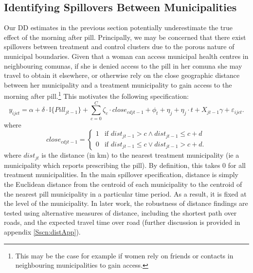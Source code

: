 \subsection{Identifying Spillovers Between Municipalities}
\label{TEENsscn:spilloverID}
Our DD estimates in the previous section potentially underestimate the 
true effect of the morning after pill.  Principally, we may be concerned that
there exist spillovers between treatment and control clusters due to the porous
nature of municipal boundaries. Given that a woman can access municipal health
centres in neighbouring comunas, if she is denied access to the pill in her
comuna she may travel to obtain it elsewhere, or otherwise rely on the close
geographic distance between her municipality and a treatment municipality to 
gain access to the morning after pill.\footnote{This may be the case for example
if women rely on friends or contacts in neighbouring municipalities to gain 
access.}  This motivates the following specification:
\begin{equation}
 \label{TEENeqn:spillover}
y_{ijct} = \alpha + \delta\cdot \mathbb{I}\{Pill_{jt-1}\} + 
\sum_{c=0}^C\zeta_c\cdot close_{cdjt-1} + \phi_t + \eta_j + \eta_j\cdot t +
X_{jt-1}\gamma + \varepsilon_{ijct}.
\end{equation}
where
\[
 close_{cdjt-1} =
  \begin{cases}
   1 & \text{if } dist_{jt-1} > c \wedge dist_{jt-1}\leq c+d   \\
   0 & \text{if } dist_{jt-1} \leq c \vee  dist_{jt-1}>c+d.
  \end{cases}
\]
where $dist_{jt}$ is the distance (in km) to the nearest treatment municipality 
(ie a municipality which reports prescribing the pill).  By definition, this takes
0 for all treatment municipalities.  In the main spillover specification, distance
is simply the Euclidean distance from the centroid of each municipality to the 
centroid of the nearest pill municipality in a particular time period.  As a result, 
it is fixed at the level of the municipality.  In later work, the robustness of 
distance findings are tested using alternative measures of distance, including the
shortest path over roads, and the expected travel time over road (further 
discussion is provided in appendix \ref{Sscn:distApp}).

